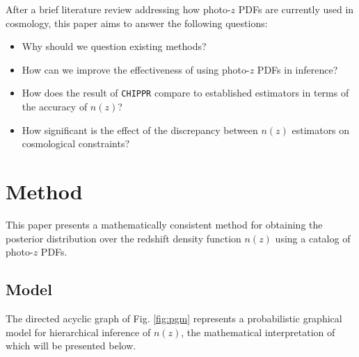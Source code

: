 \documentclass[iop]{emulateapj}
\newcommand{\chippr}{\texttt{CHIPPR} }
\begin{document}
After a brief literature review addressing how photo-$z$ PDFs are currently 
used in cosmology, this paper aims to answer the following questions:

\begin{itemize}
	\item Why should we question existing methods?
	\item How can we improve the effectiveness of using photo-$z$ PDFs in 
inference?
	\item How does the result of \chippr compare to established estimators 
in terms of the accuracy of $n(z)$?
	\item How significant is the effect of the discrepancy between $n(z)$ 
estimators on cosmological constraints?
\end{itemize}

\section{Method}
\label{sec:method}

This paper presents a mathematically consistent method for obtaining the 
posterior distribution over the redshift density function $n(z)$ using a 
catalog of photo-$z$ PDFs.

\subsection{Model}
\label{sec:model}

The directed acyclic graph of Fig. \ref{fig:pgm} represents a probabilistic 
graphical model for hierarchical inference of $n(z)$, the mathematical 
interpretation of which will be presented below.
\end{document}
